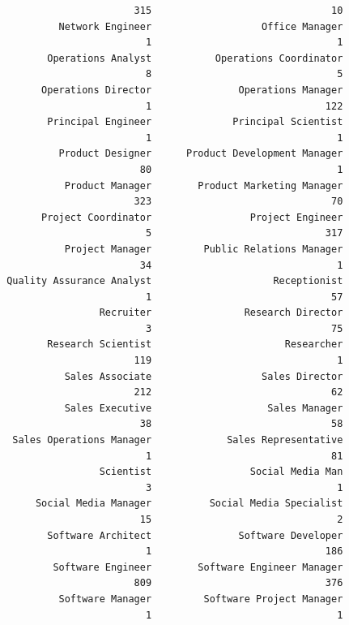 \documentclass[
  letterpaper,
  DIV=11,
  numbers=noendperiod]{scrartcl}
\begin{document}
\begin{verbatim}
                             315                               10 
                Network Engineer                   Office Manager 
                               1                                1 
              Operations Analyst           Operations Coordinator 
                               8                                5 
             Operations Director               Operations Manager 
                               1                              122 
              Principal Engineer              Principal Scientist 
                               1                                1 
                Product Designer      Product Development Manager 
                              80                                1 
                 Product Manager        Product Marketing Manager 
                             323                               70 
             Project Coordinator                 Project Engineer 
                               5                              317 
                 Project Manager         Public Relations Manager 
                              34                                1 
       Quality Assurance Analyst                     Receptionist 
                               1                               57 
                       Recruiter                Research Director 
                               3                               75 
              Research Scientist                       Researcher 
                             119                                1 
                 Sales Associate                   Sales Director 
                             212                               62 
                 Sales Executive                    Sales Manager 
                              38                               58 
        Sales Operations Manager             Sales Representative 
                               1                               81 
                       Scientist                 Social Media Man 
                               3                                1 
            Social Media Manager          Social Media Specialist 
                              15                                2 
              Software Architect               Software Developer 
                               1                              186 
               Software Engineer        Software Engineer Manager 
                             809                              376 
                Software Manager         Software Project Manager 
                               1                                1 

\end{verbatim}
\end{document}
